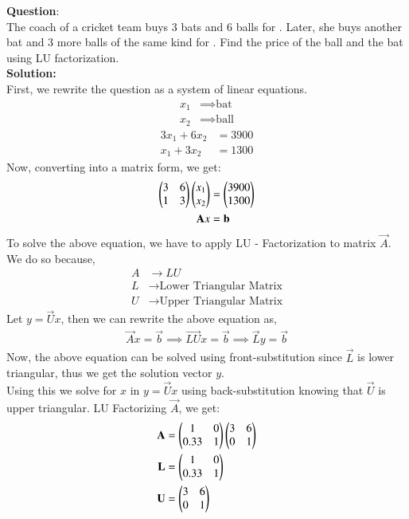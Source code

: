 \documentclass[journal]{IEEEtran}
\begin{document}
	
\textbf{Question}:\\
The coach of a cricket team buys 3 bats and 6 balls for . Later, she buys another bat and 3 more balls of the same kind for . Find the price of the ball and the bat using LU factorization. \\
\textbf{Solution: }\\
First, we rewrite the question as a system of linear equations.
\begin{align}
	x_1 &\implies \text{bat} \\
	x_2 &\implies \text{ball}
\end{align}
\begin{align}
	3x_1 + 6x_2 &= 3900 \\
	x_1 + 3x_2 &= 1300 
\end{align}
Now, converting into a matrix form, we get:
\begin{align}
	\begin{pmatrix}3&6\\1&3\end{pmatrix}\begin{pmatrix}x_1 \\ x_2\end{pmatrix} &= \begin{pmatrix}3900 \\ 1300\end{pmatrix} \\ 
	\mathbf{A}x &= \mathbf{b}
\end{align}
To solve the above equation, we have to apply LU - Factorization to matrix $\vec{A}$. \\
We do so because, 
\begin{align}
	A &\rightarrow LU \\
	L &\rightarrow \text{Lower Triangular Matrix} \\
	U &\rightarrow \text{Upper Triangular Matrix}
\end{align}
Let $y = \vec{U}x$, then we can rewrite the above equation as,
\begin{align}
	\vec{A}x = \vec{b} \implies \vec{LU}x = \vec{b} \implies \vec{L}y = \vec{b}
\end{align}
Now, the above equation can be solved using front-substitution since $\vec{L}$ is lower triangular, thus we get the solution vector $y$. \\
Using this we solve for $x$ in $y = \vec{U}x$ using back-substitution knowing that $\vec{U}$ is upper triangular. LU Factorizing $\vec{A}$, we get:
\begin{align}
	\mathbf{A} &= \begin{pmatrix}1&0\\0.33&1\end{pmatrix}\begin{pmatrix}3&6\\0&1\end{pmatrix} \\ 
	\mathbf{L} &= \begin{pmatrix}1&0\\0.33&1\end{pmatrix} \\
	\mathbf{U} &= \begin{pmatrix}3&6\\0&1\end{pmatrix}
\end{align}
\end{document}
